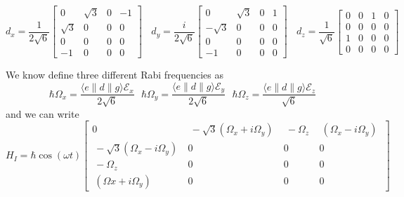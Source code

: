 \documentclass[11pt,letter]{article}
\begin{document}
\begin{equation}
    d_{x}  = \frac{1}{2\sqrt{6}}  
            \left[\begin{smallmatrix}
            0 &  \sqrt{3} & 0 & -1\\
            \sqrt{3} & 0 & 0 & 0\\
            0 & 0 & 0 & 0\\
            -1 & 0 & 0 & 0
            \end{smallmatrix}\right] \ \ \ \ 
    d_{y} =   \frac{i}{2\sqrt{6}} 
              \left[\begin{smallmatrix}
              0 & \sqrt{3} & 0 & 1\\
              -\sqrt{3} & 0 & 0 & 0\\
              0 & 0 & 0 & 0\\
              -1 & 0 & 0 & 0
              \end{smallmatrix}\right] \ \ \ \
    d_{z}  =  \frac{1}{\sqrt{6}}   
              \left[\begin{smallmatrix}
              0 & 0 & 1 & 0\\
              0 & 0 & 0 & 0\\
              1 & 0 & 0 & 0\\
              0 & 0 & 0 & 0
              \end{smallmatrix}\right]  
\end{equation}

We know define three different Rabi frequencies as 
\begin{equation}
    \hbar\Omega_{x} = \frac{ \langle e \lVert d \rVert g \rangle \mathcal{E}_{x} }{ 2\sqrt{6}}  \ \ \ 
    \hbar\Omega_{y} = \frac{ \langle e \lVert d \rVert g \rangle \mathcal{E}_{y} }{ 2\sqrt{6}}  \ \ \ 
    \hbar\Omega_{z} = \frac{ \langle e \lVert d \rVert g \rangle \mathcal{E}_{z} }{ \sqrt{6}}  
\end{equation}
and we can write 
\begin{equation}  
  H_{I} =  \hbar \cos(\omega t) 
            \left[\begin{smallmatrix}
            0 & \ -\sqrt{3}(\Omega_{x}+i\Omega_{y})\  &\ -\Omega_{z}\ &\ (\Omega_{x}-i\Omega_{y})\ \\
            \ -\sqrt{3}(\Omega_{x}-i\Omega_{y})\ & 0 & 0 & 0\\
            \ -\Omega_{z}\ & 0 & 0 & 0\\
            \ (\Omega{x}+i\Omega_{y})\  & 0 & 0 & 0
            \end{smallmatrix}\right] 
\end{equation}
\end{document}
